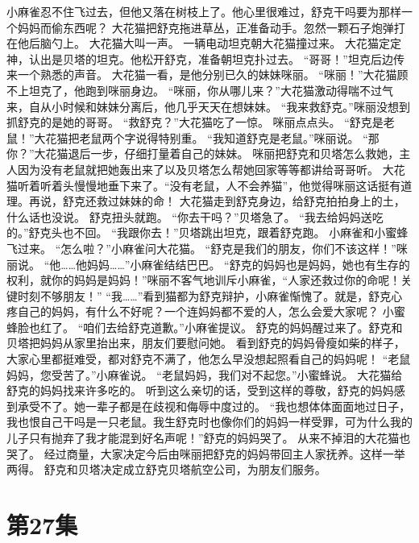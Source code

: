 \documentclass[a4paper,12pt,UTF8,twoside]{ctexbook}
\begin{document}
        小麻雀忍不住飞过去，但他又落在树枝上了。他心里很难过，舒克干吗要为那样一个妈妈而偷东西呢？ 
        大花猫把舒克拖进草丛，正准备动手。忽然一颗石子炮弹打在他后脑勺上。 
        大花猫大叫一声。 
        一辆电动坦克朝大花猫撞过来。 
        大花猫定定神，认出是贝塔的坦克。他松开舒克，准备朝坦克扑过去。 
        “哥哥！”坦克后边传来一个熟悉的声音。 
        大花猫一看，是他分别已久的妹妹咪丽。 
        “咪丽！”大花猫顾不上坦克了，他跑到咪丽身边。 
        “咪丽，你从哪儿来？”大花猫激动得喘不过气来，自从小时候和妹妹分离后，他几乎天天在想妹妹。 
        “我来救舒克。”咪丽没想到抓舒克的是她的哥哥。 
        “救舒克？”大花猫吃了一惊。 
        咪丽点点头。 
        “舒克是老鼠！”大花猫把老鼠两个字说得特别重。 
        “我知道舒克是老鼠。”咪丽说。 
        “那你？”大花猫退后一步，仔细打量着自己的妹妹。 
        咪丽把舒克和贝塔怎么救她，主人因为没有老鼠就把她轰出来了以及贝塔怎么帮她回家等等都讲给哥哥听。 
        大花猫听着听着头慢慢地垂下来了。“没有老鼠，人不会养猫”，他觉得咪丽这话挺有道理。再说，舒克还救过妹妹的命！ 
        大花猫走到舒克身边，给舒克拍拍身上的土，什么话也没说。 
        舒克扭头就跑。 
        “你去干吗？”贝塔急了。 
        “我去给妈妈送吃的。”舒克头也不回。 
        “我跟你去！”贝塔跳出坦克，跟着舒克跑。 
        小麻雀和小蜜蜂飞过来。 
        “怎么啦？”小麻雀问大花猫。 
        “舒克是我们的朋友，你们不该这样！”咪丽说。 
        “他……他妈妈……”小麻雀结结巴巴。 
        “舒克的妈妈也是妈妈，她也有生存的权利，就你的妈妈是妈妈！”咪丽不客气地训斥小麻雀，“人家还救过你的命呢！关键时刻不够朋友！” 
        “我……”看到猫都为舒克辩护，小麻雀惭愧了。就是，舒克心疼自己的妈妈，有什么不好呢？一个连妈妈都不爱的人，怎么会爱大家呢？ 
        小蜜蜂脸也红了。 
        “咱们去给舒克道歉。”小麻雀提议。 
        舒克的妈妈醒过来了。舒克和贝塔把妈妈从家里抬出来，朋友们要慰问她。 
        看到舒克的妈妈骨瘦如柴的样子，大家心里都挺难受，都对舒克不满了，他怎么早没想起照看自己的妈妈呢！ 
        “老鼠妈妈，您受苦了。”小麻雀说。 
        “老鼠妈妈，我们对不起您。”小蜜蜂说。 
        大花猫给舒克的妈妈找来许多吃的。 
        听到这么亲切的话，受到这样的尊敬，舒克的妈妈感到承受不了。她一辈子都是在歧视和侮辱中度过的。 
        “我也想体体面面地过日子，我也恨自己干吗是一只老鼠。我生舒克时也像你们的妈妈一样受罪，可为什么我的儿子只有抛弃了我才能混到好名声呢！”舒克的妈妈哭了。 
        从来不掉泪的大花猫也哭了。 
        经过商量，大家决定今后由咪丽把舒克的妈妈带回主人家抚养。这样一举两得。 
        舒克和贝塔决定成立舒克贝塔航空公司，为朋友们服务。   \chapter{第27集} 
\end{document}

